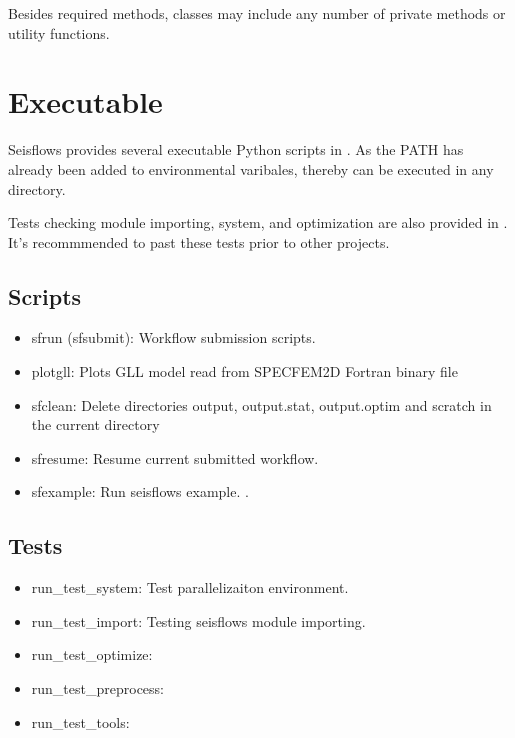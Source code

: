 \documentclass[letterpaper,10pt,english]{sphinxmanual}
\begin{document}
Besides required methods, classes may include any number of private methods or utility functions.


\chapter{Executable}
\label{\detokenize{index:executable}}
Seisflows provides several executable Python scripts in . As the PATH has already been added to environmental varibales, thereby can be executed in any directory.

Tests checking module importing, system, and optimization are also provided in . It’s recommmended to past these tests prior to other projects.


\section{Scripts}
\label{\detokenize{main/executable:scripts}}\label{\detokenize{main/executable::doc}}\begin{itemize}
\item {} 
sfrun (sfsubmit): Workflow submission scripts.

\item {} 
plotgll: Plots GLL model read from SPECFEM2D Fortran binary file

\item {} 
sfclean: Delete directories output, output.stat, output.optim
and scratch in the current directory

\item {} 
sfresume: Resume current submitted workflow.

\item {} 
sfexample: Run seisflows example. .

\end{itemize}


\section{Tests}
\label{\detokenize{main/executable:tests}}\begin{itemize}
\item {} 
run\_test\_system: Test parallelizaiton environment.

\item {} 
run\_test\_import: Testing seisflows module importing.

\item {} 
run\_test\_optimize:

\item {} 
run\_test\_preprocess:

\item {} 
run\_test\_tools:

\end{itemize}
\end{document}
